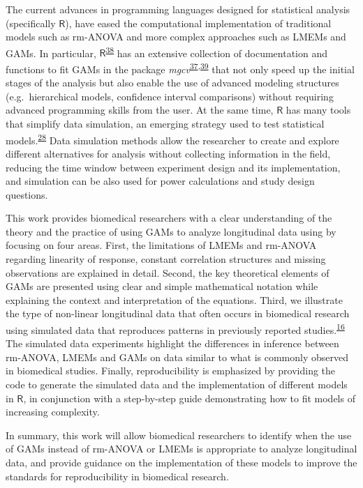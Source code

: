\documentclass[
]{article}
\begin{document}
The current advances in programming languages designed for statistical analysis (specifically \(\textsf{R}\)), have eased the computational implementation of traditional models such as rm-ANOVA and more complex approaches such as LMEMs and GAMs. In particular, \(\textsf{R}\)\textsuperscript{\protect\hyperlink{ref-r}{38}} has an extensive collection of documentation and functions to fit GAMs in the package \emph{mgcv}\textsuperscript{\protect\hyperlink{ref-wood2017}{37},\protect\hyperlink{ref-wood2016}{39}} that not only speed up the initial stages of the analysis but also enable the use of advanced modeling structures (e.g.~hierarchical models, confidence interval comparisons) without requiring advanced programming skills from the user. At the same time, \(\textsf{R}\) has many tools that simplify data simulation, an emerging strategy used to test statistical models.\textsuperscript{\protect\hyperlink{ref-haverkamp2017}{28}} Data simulation methods allow the researcher to create and explore different alternatives for analysis without collecting information in the field, reducing the time window between experiment design and its implementation, and simulation can be also used for power calculations and study design questions.

This work provides biomedical researchers with a clear understanding of the theory and the practice of using GAMs to analyze longitudinal data using by focusing on four areas. First, the limitations of LMEMs and rm-ANOVA regarding linearity of response, constant correlation structures and missing observations are explained in detail. Second, the key theoretical elements of GAMs are presented using clear and simple mathematical notation while explaining the context and interpretation of the equations. Third, we illustrate the type of non-linear longitudinal data that often occurs in biomedical research using simulated data that reproduces patterns in previously reported studies.\textsuperscript{\protect\hyperlink{ref-vishwanath2009}{16}} The simulated data experiments highlight the differences in inference between rm-ANOVA, LMEMs and GAMs on data similar to what is commonly observed in biomedical studies. Finally, reproducibility is emphasized by providing the code to generate the simulated data and the implementation of different models in \(\textsf{R}\), in conjunction with a step-by-step guide demonstrating how to fit models of increasing complexity.

In summary, this work will allow biomedical researchers to identify when the use of GAMs instead of rm-ANOVA or LMEMs is appropriate to analyze longitudinal data, and provide guidance on the implementation of these models to improve the standards for reproducibility in biomedical research.
\end{document}
